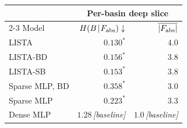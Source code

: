 \begin{tabular}[t]{@{}l rr@{}}
\toprule
& \multicolumn{2}{c}{Per-basin deep slice} \\
\cmidrule(l){2-3}
Model & $H(B\!\mid\!F_{\rm abs})\downarrow$ & $\overline{|F_{\rm abs}|}$ \\
\midrule
LISTA & ${\mathbf{0.130}}^{\ast}$ & $\mathbf{4.0}$ \\
LISTA-BD & ${0.156}^{\ast}$ & $3.8$ \\
LISTA-SB & ${0.153}^{\ast}$ & $3.8$ \\
Sparse MLP, BD & ${0.358}^{\ast}$ & $3.0$ \\
Sparse MLP & ${0.223}^{\ast}$ & $3.3$ \\
\midrule
Dense MLP & $1.28$\,\emph{[baseline]} & $1.0$\,\emph{[baseline]} \\
\bottomrule
\end{tabular}
